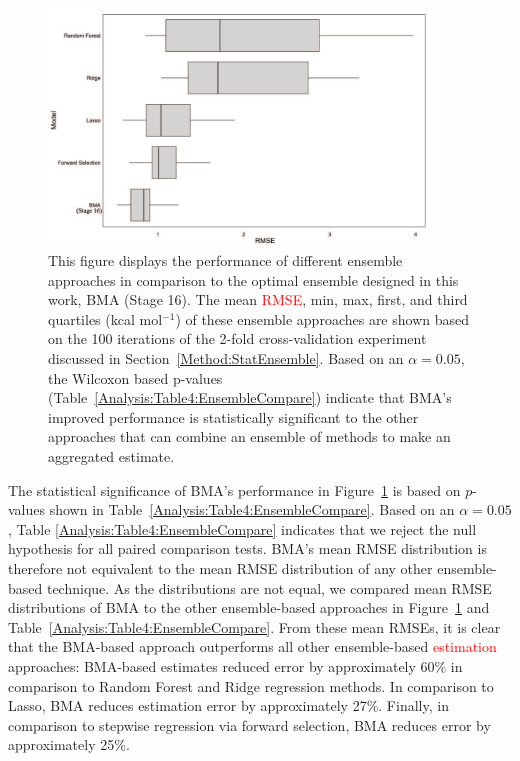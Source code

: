 \documentclass[journal=jpcbfk, manuscript=article]{achemso}
\newcommand{\+}[1]{\ensuremath{\mathbf{#1}}}
\newcommand{\rev}[1]{\textsf{\textcolor{red}{#1}}}
\begin{document}
\begin{figure}
	\centering
	\includegraphics[keepaspectratio,width=0.9\textwidth]{Figures/BMA_Xval_baselineModels_RMSE}
	\caption{This figure displays the performance of different ensemble approaches in comparison to the optimal ensemble designed in this work, BMA (Stage 16).
	The mean \rev{RMSE}, min, max, first, and third quartiles (kcal mol$^{-1}$) of these ensemble approaches are shown based on the 100 iterations of the 2-fold cross-validation experiment discussed in Section~\ref{Method:StatEnsemble}.
	Based on an $\alpha = 0.05$, the Wilcoxon based p-values (Table~\ref{Analysis:Table4:EnsembleCompare}) indicate that BMA's improved performance is statistically significant to the other approaches that can combine an ensemble of methods to make an aggregated estimate.}
	\label{Analysis:Figure6:Models}
\end{figure}
The statistical significance of BMA's performance in Figure~\ref{Analysis:Figure6:Models} is based on $p$-values shown in Table~\ref{Analysis:Table4:EnsembleCompare}. Based on an $\alpha = 0.05$, Table \ref{Analysis:Table4:EnsembleCompare} indicates that we reject the null hypothesis for all paired comparison tests.
BMA's mean RMSE distribution is therefore not equivalent to the mean RMSE distribution of any other ensemble-based technique. 
As the distributions are not equal, we compared mean RMSE distributions of BMA to the other ensemble-based approaches in Figure~\ref{Analysis:Figure6:Models} and Table~\ref{Analysis:Table4:EnsembleCompare}.
From these mean RMSEs, it is clear that the BMA-based approach outperforms all other ensemble-based \rev{estimation} approaches: BMA-based estimates reduced error by approximately 60\% in comparison to Random Forest and Ridge regression methods. In comparison to Lasso, BMA reduces estimation error by approximately 27\%.
Finally, in comparison to stepwise regression via forward selection, BMA reduces error by approximately 25\%.
\end{document}
